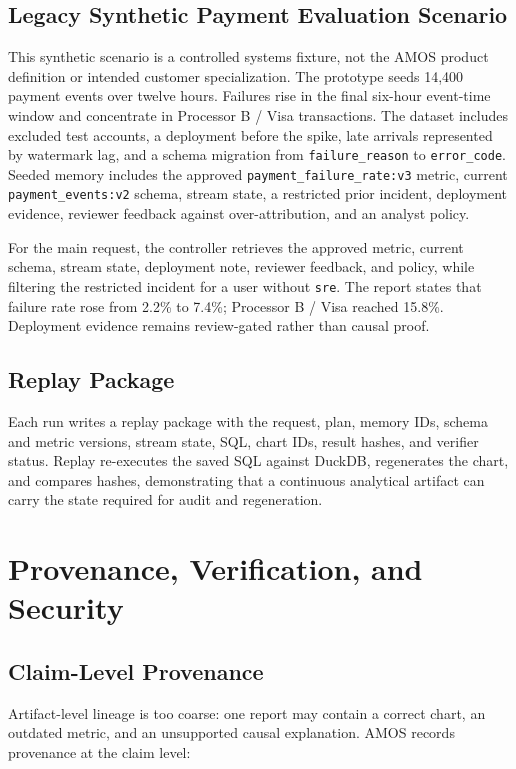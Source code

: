 \documentclass[10pt]{article}
\newcommand{\amos}{\textsc{AMOS}\xspace}
\newcommand{\code}[1]{\texttt{#1}}
\begin{document}
\subsection{Legacy Synthetic Payment Evaluation Scenario}
This synthetic scenario is a controlled systems fixture, not the AMOS product definition or intended customer specialization. The prototype seeds 14{,}400 payment events over twelve hours. Failures rise in the final six-hour event-time window and concentrate in Processor B / Visa transactions. The dataset includes excluded test accounts, a deployment before the spike, late arrivals represented by watermark lag, and a schema migration from \code{failure\_reason} to \code{error\_code}. Seeded memory includes the approved \code{payment\_failure\_rate:v3} metric, current \code{payment\_events:v2} schema, stream state, a restricted prior incident, deployment evidence, reviewer feedback against over-attribution, and an analyst policy.

For the main request, the controller retrieves the approved metric, current schema, stream state, deployment note, reviewer feedback, and policy, while filtering the restricted incident for a user without \code{sre}. The report states that failure rate rose from 2.2\% to 7.4\%; Processor B / Visa reached 15.8\%. Deployment evidence remains review-gated rather than causal proof.

\subsection{Replay Package}
Each run writes a replay package with the request, plan, memory IDs, schema and metric versions, stream state, SQL, chart IDs, result hashes, and verifier status. Replay re-executes the saved SQL against DuckDB, regenerates the chart, and compares hashes, demonstrating that a continuous analytical artifact can carry the state required for audit and regeneration.

\section{Provenance, Verification, and Security}

\subsection{Claim-Level Provenance}
Artifact-level lineage is too coarse: one report may contain a correct chart, an outdated metric, and an unsupported causal explanation. \amos records provenance at the claim level:
\end{document}
